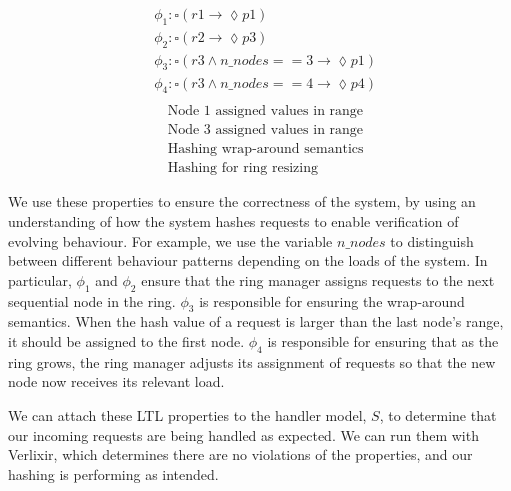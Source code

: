 \begin{multicols}{2}
    \[
        \begin{aligned}
        & \phi_1: \square ( r1 \rightarrow \lozenge p1 ) \\
        & \phi_2: \square ( r2 \rightarrow \lozenge p3 ) \\
        & \phi_3: \square ( r3 \land n\_nodes == 3 \rightarrow \lozenge p1 ) \\
        & \phi_4: \square ( r3 \land n\_nodes == 4 \rightarrow \lozenge p4 ) \\
        \end{aligned}
    \]
    \vline
    \[
    \begin{aligned}
    &\text{Node 1 assigned values in range} \\
    &\text{Node 3 assigned values in range} \\
    &\text{Hashing wrap-around semantics} \\
    &\text{Hashing for ring resizing}
    \end{aligned}
    \]
\end{multicols}
We use these properties to ensure the correctness of the system, by using an understanding of how the system hashes requests to enable verification of evolving behaviour. For example, we use the variable $n\_nodes$ to distinguish between different behaviour patterns depending on the loads of the system. In particular, $\phi_1$ and $\phi_2$ ensure that the ring manager assigns requests to the next sequential node in the ring. $\phi_3$ is responsible for ensuring the wrap-around semantics. When the hash value of a request is larger than the last node's range, it should be assigned to the first node. $\phi_4$ is responsible for ensuring that as the ring grows, the ring manager adjusts its assignment of requests so that the new node now receives its relevant load.
\par
We can attach these LTL properties to the handler model, $S$, to determine that our incoming requests are being handled as expected. We can run them with Verlixir, which determines there are no violations of the properties, and our hashing is performing as intended.
